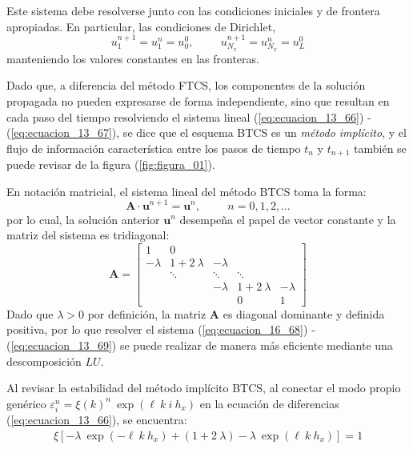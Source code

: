 Este sistema debe resolverse junto con las condiciones iniciales y de frontera apropiadas. En particular, las condiciones de Dirichlet,
\begin{equation}
u_{1}^{n+1} = u_{1}^{n} = u_{0}^{0}, \hspace{1cm} u_{N_{x}}^{n+1} = u_{N_{x}}^{n} = u_{L}^{0}
\label{eq:ecuacion_13_67}
\end{equation}
manteniendo los valores constantes en las fronteras.
\par
Dado que, a diferencia del método FTCS, los componentes de la solución propagada no pueden expresarse de forma independiente, sino que resultan en cada paso del tiempo resolviendo el sistema lineal (\ref{eq:ecuacion_13_66}) - (\ref{eq:ecuacion_13_67}), se dice que el esquema BTCS es un \emph{método implícito}, y el flujo de información característica entre los pasos de tiempo $t_{n}$ y $t_{n+1}$ también se puede revisar de la figura (\ref{fig:figura_01}).
\par
En notación matricial, el sistema lineal del método BTCS toma la forma:
\begin{equation}
\mathbf{A} \cdot \mathbf{u}^{n+1} = \mathbf{u}^{n}, \hspace{1cm} n = 0, 1, 2, \ldots
\label{eq:ecuacion_16_68}
\end{equation}
por lo cual, la solución anterior $\mathbf{u}^{n}$ desempeña el papel de vector constante y la matriz del sistema es tridiagonal:
\begin{equation}
\mathbf{A} = \begin{bmatrix}
1 & 0 & & &  \\
-\lambda & 1 + 2 \: \lambda & - \lambda & & \\
  & \ddots & \ddots & \ddots & \\
  & & - \lambda & 1 + 2 \: \lambda & - \lambda \\
  & & & 0 & 1
\end{bmatrix}
\label{eq:ecuacion_13_69}
\end{equation}
Dado que $\lambda > 0$ por definición, la matriz $\mathbf{A}$ es diagonal dominante y definida positiva, por lo que resolver el sistema (\ref{eq:ecuacion_16_68}) - (\ref{eq:ecuacion_13_69}) se puede realizar de manera más eficiente mediante una descomposición $LU$.
\par
Al revisar la estabilidad del método implícito BTCS, al conectar el modo propio genérico $\varepsilon_{i}^{n} = \xi(k)^{n} \: \exp(\ell \: k \: i \: h_{x})$ en la ecuación de diferencias (\ref{eq:ecuacion_13_66}), se encuentra:
\begin{align*}
\xi [ - \lambda \: \exp(- \ell \: k \: h_{x}) + (1 + 2 \: \lambda) - \lambda \: \exp(\ell \: k \: h_{x}) ] = 1
\end{align*}
